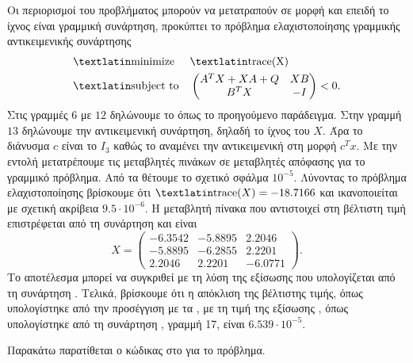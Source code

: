 Οι περιορισμοί του προβλήματος μπορούν να μετατραπούν σε  μορφή και
επειδή το ίχνος είναι γραμμική συνάρτηση, προκύπτει το πρόβλημα ελαχιστοποίησης 
γραμμικής αντικειμενικής συνάρτησης
\begin{equation*}
    \begin{aligned}
        & \text{\tl{minimize}} & & \text{\tl{trace(X)}} \\
        & \text{\tl{subject to}} & &
        \begin{pmatrix}
            A^TX + XA + Q & XB \\
            B^TX & -I
        \end{pmatrix} < 0.
    \end{aligned}
\end{equation*}
Στις γραμμές \(6\) με \(12\) δηλώνουμε το  όπως το προηγούμενο παράδειγμα. Στην
γραμμή \(13\) δηλώνουμε την αντικειμενική συνάρτηση, δηλαδή το ίχνος του
\(X\). Άρα το διάνυσμα \(c\) είναι το \(I_3\) καθώς το  αναμένει την
αντικειμενική στη μορφή \(c^Tx\). Με την εντολή  μετατρέπουμε τις
μεταβλητές πινάκων σε μεταβλητές απόφασης για το γραμμικό πρόβλημα. Από τα
 θέτουμε το σχετικό σφάλμα \(10^{-5}\). Λύνοντας το
 πρόβλημα ελαχιστοποίησης βρίσκουμε ότι \( \text{\tl{trace}}(X) =
-18.7166\) και ικανοποιείται με σχετική ακρίβεια \(9.5\cdot10^{-6}\). Η μεταβλητή
πίνακα που αντιστοιχεί στη βέλτιστη τιμή επιστρέφεται από τη συνάρτηση
 και είναι
\begin{equation*}
    X =
    \begin{pmatrix}
        -6.3542 & -5.8895 & 2.2046 \\
        -5.8895 & -6.2855 & 2.2201 \\
        2.2046 & 2.2201 & -6.0771
    \end{pmatrix}.
\end{equation*}
Το αποτέλεσμα μπορεί να συγκριθεί με τη λύση της εξίσωσης  που
υπολογίζεται από τη συνάρτηση . Τελικά, βρίσκουμε ότι η απόκλιση της
βέλτιστης τιμής, όπως υπολογίστηκε από την προσέγγιση με τα , με τη τιμή
της εξίσωσης , όπως υπολογίστηκε από τη συνάρτηση ,
γραμμή 17, είναι \(6.539\cdot10^{-5}\).

Παρακάτω παρατίθεται ο κώδικας στο  για το πρόβλημα.
\begin{otherlanguage}{english}
    
\end{otherlanguage}
